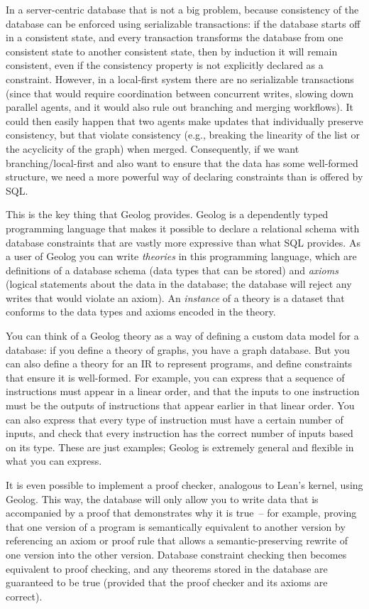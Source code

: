 \documentclass{article}
\begin{document}
In a server-centric database that is not a big problem, because consistency of the database can be enforced using serializable transactions: if the database starts off in a consistent state, and every transaction transforms the database from one consistent state to another consistent state, then by induction it will remain consistent, even if the consistency property is not explicitly declared as a constraint.
However, in a local-first system there are no serializable transactions (since that would require coordination between concurrent writes, slowing down parallel agents, and it would also rule out branching and merging workflows).
It could then easily happen that two agents make updates that individually preserve consistency, but that violate consistency (e.g., breaking the linearity of the list or the acyclicity of the graph) when merged.
Consequently, if we want branching/local-first and also want to ensure that the data has some well-formed structure, we need a more powerful way of declaring constraints than is offered by SQL.

This is the key thing that Geolog provides.
Geolog is a dependently typed programming language that makes it possible to declare a relational schema with database constraints that are vastly more expressive than what SQL provides.
As a user of Geolog you can write \emph{theories} in this programming language, which are definitions of a database schema (data types that can be stored) and \emph{axioms} (logical statements about the data in the database; the database will reject any writes that would violate an axiom).
An \emph{instance} of a theory is a dataset that conforms to the data types and axioms encoded in the theory.

You can think of a Geolog theory as a way of defining a custom data model for a database: if you define a theory of graphs, you have a graph database.
But you can also define a theory for an IR to represent programs, and define constraints that ensure it is well-formed.
For example, you can express that a sequence of instructions must appear in a linear order, and that the inputs to one instruction must be the outputs of instructions that appear earlier in that linear order.
You can also express that every type of instruction must have a certain number of inputs, and check that every instruction has the correct number of inputs based on its type.
These are just examples; Geolog is extremely general and flexible in what you can express.

It is even possible to implement a proof checker, analogous to Lean's kernel, using Geolog.
This way, the database will only allow you to write data that is accompanied by a proof that demonstrates why it is true~-- for example, proving that one version of a program is semantically equivalent to another version by referencing an axiom or proof rule that allows a semantic-preserving rewrite of one version into the other version.
Database constraint checking then becomes equivalent to proof checking, and any theorems stored in the database are guaranteed to be true (provided that the proof checker and its axioms are correct).
\end{document}
